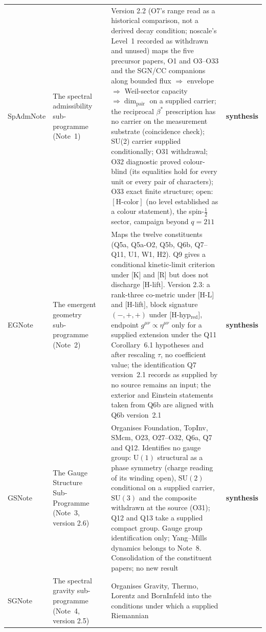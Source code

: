 \documentclass[11pt,a4paper]{article}
\newcommand{\SU}{\mathrm{SU}}
\newcommand{\ssynth}{\textcolor{csynth}{\textbf{synthesis}}}
\begin{document}
\begin{longtable}{@{}p{1.70cm}p{2.9cm}p{1.3cm}p{6.25cm}>{\raggedright\arraybackslash}p{2.0cm}@{}}
      \midrule
      SpAdm\-Note & The spectral admissibility sub-programme (Note~1) & \cite{Beau2026a1note} &
      Version 2.2 (O7's range read as a historical comparison, not a derived decay condition; noscale's
      Level~1 recorded as withdrawn and unused) maps the five precursor papers, O1 and
      O3--O33 and the SGN/CC companions along
      bounded flux $\Rightarrow$ envelope $\Rightarrow$ Weil-sector capacity $\Rightarrow
      \dim_{\mathrm{pair}}$ on a supplied carrier; the reciprocal $\beta^*$ prescription has no carrier
      on the measurement substrate (coincidence check); SU(2) carrier supplied conditionally; O31
      withdrawal; O32 diagnostic proved colour-blind (its equalities hold for every unit or every pair of
      characters); O33 exact finite structure; open: $[\mathrm{H\text{-}color}]$ (no level established as a
      colour statement), the spin-$\tfrac12$ sector, campaign beyond $q = 211$ &
      \ssynth \\[3pt]
      EG\-Note & The emergent geometry sub-programme (Note~2) & \cite{Beau2026egnote} &
      Maps the twelve constituents (Q5a, Q5a-O2, Q5b, Q6b, Q7--Q11, U1, W1, H2).
      Q9 gives a conditional kinetic-limit criterion under [K] and [R] but does not discharge [H-lift]. Version 2.3:
      a rank-three co-metric under [H-L] and [H-lift], block signature $(-,+,+)$ under [H-hyp$_{\mathrm{red}}$],
      endpoint $g^{\mu\nu}\propto\eta^{\mu\nu}$ only for a supplied extension under the Q11 Corollary~6.1
      hypotheses and after rescaling $\tau$, no coefficient value; the identification Q7 version~2.1 records as supplied by no source remains
      an input; the exterior and Einstein statements taken from Q6b are aligned with Q6b version~2.1 &
      \ssynth \\[3pt]
      GS\-Note & The Gauge Structure Sub-Programme (Note~3, version 2.6) & \cite{Beau2026gsnote} &
      Organises Foundation, TopInv, SMcm, O23, O27--O32, Q6a, Q7 and Q12. Identifies no gauge group:
      $\mathrm{U}(1)$ structural as a phase symmetry (charge reading of its winding open), $\SU(2)$
      conditional on a supplied carrier, $\SU(3)$ and the
      composite withdrawn at the source (O31); Q12 and Q13 take a supplied compact group.
      Gauge group identification only; Yang--Mills dynamics belongs to
      Note~8. Consolidation of the constituent papers; no new result &
      \ssynth \\[3pt]
      SG\-Note & The spectral gravity sub-programme (Note~4, version 2.5) & \cite{Beau2026sgnote} &
      Organises Gravity, Thermo, Lorentz and BornInfeld into the conditions under which a supplied Riemannian

\end{longtable}
\end{document}
